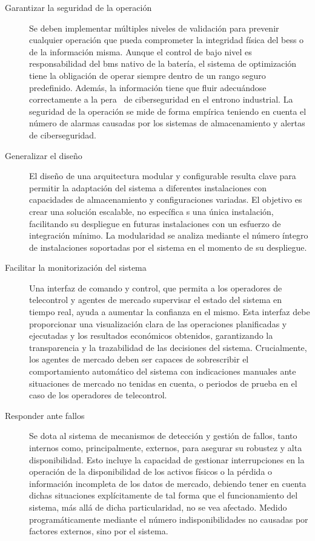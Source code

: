 \begin{description}
  \item[Garantizar la seguridad de la operación] Se deben implementar múltiples niveles de validación para prevenir cualquier operación que pueda comprometer la integridad física del \gls{bess} o de la información misma. Aunque el control de bajo nivel es responsabilidad del \gls{bms} nativo de la batería, el sistema de optimización tiene la obligación de operar siempre dentro de un rango seguro predefinido. Además, la información tiene que fluir adecuándose correctamente a la \gls{pera}~\cite{williams1994purdue} de ciberseguridad en el entrono industrial. La seguridad de la operación se mide de forma empírica teniendo en cuenta el número de alarmas causadas por los sistemas de almacenamiento y alertas de ciberseguridad.

  \item[Generalizar el diseño] El diseño de una arquitectura modular y configurable resulta clave para permitir la adaptación del sistema a diferentes instalaciones con capacidades de almacenamiento y configuraciones variadas. El objetivo es crear una solución escalable, no específica s una única instalación, facilitando su despliegue en futuras instalaciones con un esfuerzo de integración mínimo. La modularidad se analiza mediante el número íntegro de instalaciones soportadas por el sistema en el momento de su despliegue.

  \item[Facilitar la monitorización del sistema] Una interfaz de comando y control, que permita a los operadores de telecontrol y agentes de mercado supervisar el estado del sistema en tiempo real, ayuda a aumentar la confianza en el mismo. Esta interfaz debe proporcionar una visualización clara de las operaciones planificadas y ejecutadas y los resultados económicos obtenidos, garantizando la transparencia y la trazabilidad de las decisiones del sistema. Crucialmente, los agentes de mercado deben ser capaces de sobrescribir el comportamiento automático del sistema con indicaciones manuales ante situaciones de mercado no tenidas en cuenta, o periodos de prueba en el caso de los operadores de telecontrol.

  \item[Responder ante fallos] Se dota al sistema de mecanismos de detección y gestión de fallos, tanto internos como, principalmente, externos, para asegurar su robustez y alta disponibilidad. Esto incluye la capacidad de gestionar interrupciones en la operación de la disponibilidad de los activos físicos o la pérdida o información incompleta de los datos de mercado, debiendo tener en cuenta dichas situaciones explícitamente de tal forma que el funcionamiento del sistema, más allá de dicha particularidad, no se vea afectado. Medido programáticamente mediante el número indisponibilidades no causadas por factores externos, sino por el sistema.


\end{description}
